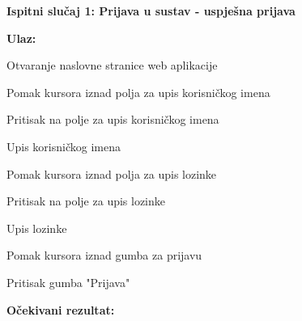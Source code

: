 %			 
%			

\textbf{Ispitni slučaj 1: Prijava u sustav - uspješna prijava}
			
				\noindent\textbf{Ulaz:}
				
					\begin{packed_enum}
					
						\item Otvaranje naslovne stranice web aplikacije
						\item Pomak kursora iznad polja za upis korisničkog imena
						\item Pritisak na polje za upis korisničkog imena
						\item Upis korisničkog imena
						\item Pomak kursora iznad polja za upis lozinke
						\item Pritisak na polje za upis lozinke
						\item Upis lozinke
						\item Pomak kursora iznad gumba za prijavu
						\item Pritisak gumba "Prijava"
						
					\end{packed_enum}
				
				\noindent\textbf{Očekivani rezultat:}
				
